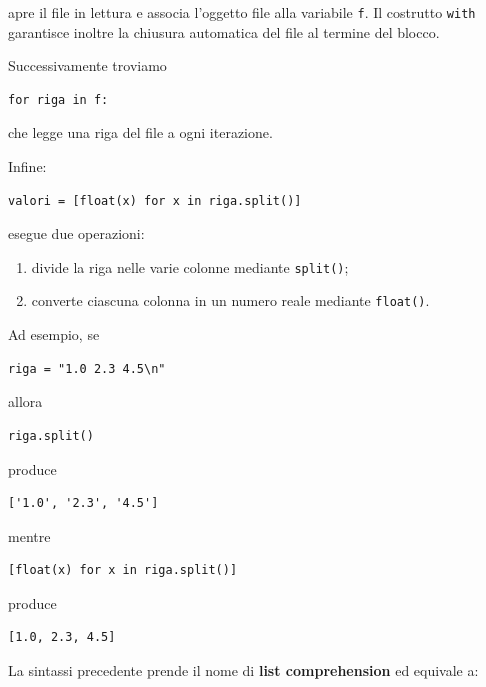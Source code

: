 \documentclass[11pt,a4paper]{book}
\begin{document}
apre il file in lettura e associa l'oggetto file alla variabile \texttt{f}. Il costrutto \texttt{with} garantisce inoltre la chiusura automatica del file al termine del blocco.

Successivamente troviamo

\begin{lstlisting}[style=python]
for riga in f:
\end{lstlisting}

che legge una riga del file a ogni iterazione.

Infine:

\begin{lstlisting}[style=python]
valori = [float(x) for x in riga.split()]
\end{lstlisting}

esegue due operazioni:

\begin{enumerate}
    \item divide la riga nelle varie colonne mediante \texttt{split()};
    \item converte ciascuna colonna in un numero reale mediante \texttt{float()}.
\end{enumerate}

Ad esempio, se

\begin{lstlisting}[style=python]
riga = "1.0 2.3 4.5\n"
\end{lstlisting}

allora

\begin{lstlisting}[style=python]
riga.split()
\end{lstlisting}

produce

\begin{lstlisting}[style=output]
['1.0', '2.3', '4.5']
\end{lstlisting}

mentre

\begin{lstlisting}[style=python]
[float(x) for x in riga.split()]
\end{lstlisting}

produce

\begin{lstlisting}[style=output]
[1.0, 2.3, 4.5]
\end{lstlisting}

La sintassi precedente prende il nome di \textbf{list comprehension} ed equivale a:
\end{document}
